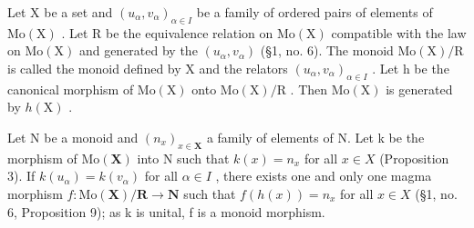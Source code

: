 Let X be a set and \((u_{\alpha}, v_{\alpha})_{\alpha \in I}\) be a family of ordered pairs of elements of \(\mathrm{Mo}(\mathrm{X})\) . Let R be the equivalence relation on \(\mathrm{Mo}(\mathrm{X})\) compatible with the law on \(\mathrm{Mo}(\mathrm{X})\) and generated by the \((u_{\alpha}, v_{\alpha})\) (§1, no. 6). The monoid \(\mathrm{Mo}(\mathrm{X})/\mathrm{R}\) is called the monoid defined by X and the relators \((u_{\alpha}, v_{\alpha})_{\alpha \in I}\) . Let h be the canonical morphism of \(\mathrm{Mo}(\mathrm{X})\) onto \(\mathrm{Mo}(\mathrm{X})/\mathrm{R}\) . Then \(\mathrm{Mo}(\mathrm{X})\) is generated by \(h(\mathrm{X})\) .

Let N be a monoid and \((n_{x})_{x\in\mathbf{X}}\) a family of elements of N. Let k be the morphism of \(\mathrm{Mo}(\mathbf{X})\) into N such that \(k(x)=n_{x}\) for all \(x\in X\) (Proposition 3). If \(k(u_{\alpha})=k(v_{\alpha})\) for all \(\alpha\in I\) , there exists one and only one magma morphism \(f:\mathrm{Mo}(\mathbf{X})/\mathbf{R}\to\mathbf{N}\) such that \(f(h(x))=n_{x}\) for all \(x\in X\) (§1, no. 6, Proposition 9); as k is unital, f is a monoid morphism.
